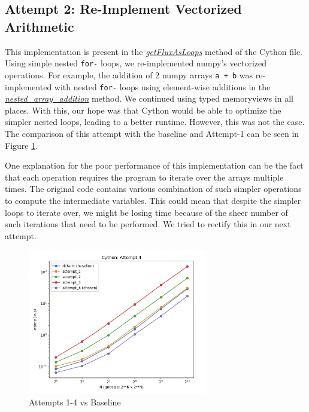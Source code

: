 \documentclass[a4paper,10pt]{article}
\begin{document}
\subsection{Attempt 2: Re-Implement Vectorized Arithmetic}
This implementation is present in the \href{https://github.com/paulmyr/DD2358-HPC25/blob/master/10_project_rishi_paul/code/cython/finitevolume_cython_lib.pyx#L155}{\textit{getFluxAsLoops}} method of the Cython file. Using simple nested \verb|for-| loops, we re-implemented numpy's vectorized operations. For example, the addition of 2 numpy arrays \verb|a + b| was re-implemented with nested \verb|for-| loops using element-wise additions in the \href{https://github.com/paulmyr/DD2358-HPC25/blob/master/10_project_rishi_paul/code/cython/finitevolume_cython_lib.pyx#L91}{\textit{nested\_array\_addition}} method. We continued using typed memoryviews in all places. With this, our hope was that Cython would be able to optimize the simpler nested loops, leading to a better runtime. However, this was not the case. The comparison of this attempt with the baseline and Attempt-1 can be seen in 
Figure \ref{fig:cython_attempts}. 

One explanation for the poor performance of this implementation can be the fact that each operation requires the program to iterate over the arrays multiple times. The original code contains various combination of such simpler operations to compute the intermediate variables. This could mean that despite the simpler loops to iterate over, we might be losing time because of the sheer number of such iterations that need to be performed. We tried to rectify this in our next attempt.

\begin{figure}[h]
  \centering
  \includegraphics[width=0.7\textwidth]{images/cython/cython_attempt_4.png}
  \caption{Attempts 1-4 vs Baseline}
  \label{fig:cython_attempts}
\end{figure}
\end{document}
